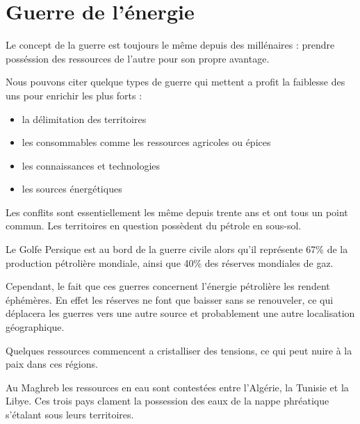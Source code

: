 \section{Guerre de l'énergie}
\vskip -15pt

Le concept de la guerre est toujours le même depuis des millénaires : prendre posséssion des
ressources de l'autre pour son propre avantage.

Nous pouvons citer quelque types de guerre qui mettent a profit la faiblesse des uns
pour enrichir les plus forts :

\begin{itemize}
  \item la délimitation des territoires %
  \item les consommables comme les ressources agricoles ou épices
  \item les connaissances et technologies
  \item les sources énergétiques
\end{itemize}

Les conflits sont essentiellement les même depuis trente ans et ont tous un point commun.
Les territoires en question possèdent du pétrole en sous-sol.

Le Golfe Persique est au bord de la guerre civile alors qu'il représente 67\%
de la production pétrolière mondiale, ainsi que 40\% des réserves mondiales de gaz.

Cependant, le fait que ces guerres concernent l'énergie pétrolière les rendent éphémères.
En effet les réserves ne font que baisser sans se renouveler, ce qui déplacera les
guerres vers une autre source et probablement une autre localisation géographique.

Quelques ressources commencent a cristalliser des tensions, ce qui peut nuire à la paix
dans ces régions.

Au Maghreb les ressources en eau sont contestées entre l'Algérie, la Tunisie et la Libye. Ces
trois pays clament la possession des eaux de la nappe phréatique s'étalant sous leurs
territoires.

